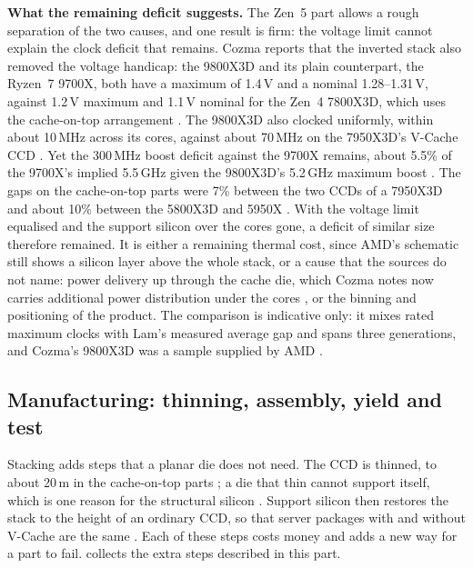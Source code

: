 \textbf{What the remaining deficit suggests.} The Zen~5 part allows a rough separation of the two causes, and one result is firm: the voltage limit cannot explain the clock deficit that remains. Cozma reports that the inverted stack also removed the voltage handicap: the 9800X3D and its plain counterpart, the Ryzen~7 9700X, both have a maximum of 1.4\,V and a nominal 1.28--1.31\,V, against 1.2\,V maximum and 1.1\,V nominal for the Zen~4 7800X3D, which uses the cache-on-top arrangement \cite{cozmaAMDs9800X3D2nd2024}. The 9800X3D also clocked uniformly, within about 10\,MHz across its cores, against about 70\,MHz on the 7950X3D's V-Cache CCD \cite{cozmaAMDs9800X3D2nd2024}. Yet the 300\,MHz boost deficit against the 9700X remains, about 5.5\% of the 9700X's implied 5.5\,GHz given the 9800X3D's 5.2\,GHz maximum boost \cite{cozmaAMDs9800X3D2nd2024,advancedmicrodevicesinc.AMDRyzen72024}. The gaps on the cache-on-top parts were 7\% between the two CCDs of a 7950X3D and about 10\% between the 5800X3D and 5950X \cite{lamAMDs7950X3DZen2023}. With the voltage limit equalised and the support silicon over the cores gone, a deficit of similar size therefore remained. It is either a remaining thermal cost, since AMD's schematic still shows a silicon layer above the whole stack, or a cause that the sources do not name: power delivery up through the cache die, which Cozma notes now carries additional power distribution under the cores \cite{cozmaAMDs9800X3D2nd2024}, or the binning and positioning of the product. The comparison is indicative only: it mixes rated maximum clocks with Lam's measured average gap and spans three generations, and Cozma's 9800X3D was a sample supplied by AMD \cite{cozmaAMDs9800X3D2nd2024}.




\subsection{Manufacturing: thinning, assembly, yield and test}
\label{sec:manufacturing}
Stacking adds steps that a planar die does not need. The CCD is thinned, to about 20\,\textmu m in the cache-on-top parts \cite{cozmaAMDs9800X3D2nd2024}; a die that thin cannot support itself, which is one reason for the structural silicon \cite[slide~12]{wuu2022vcache}. Support silicon then restores the stack to the height of an ordinary CCD, so that server packages with and without V-Cache are the same \cite[slide~17]{wuu2022vcache}. Each of these steps costs money and adds a new way for a part to fail.  collects the extra steps described in this part.

